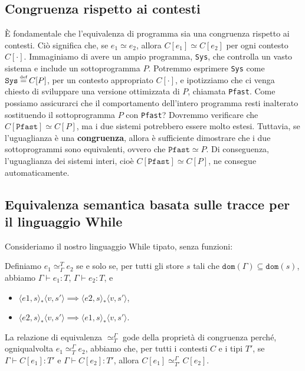 \subsection{Congruenza rispetto ai contesti}
È fondamentale che l'equivalenza di programma sia una congruenza rispetto ai
contesti. Ciò significa che, se \( e_1 \simeq e_2 \), allora \( C[e_1] \simeq
C[e_2] \) per ogni contesto \( C[\cdot] \). Immaginiamo di avere un ampio programma,
\texttt{Sys}, che controlla un vasto sistema e include un sottoprogramma \( P \).
Potremmo esprimere \texttt{Sys} come \( \texttt{Sys} \defeq C[P] \), per un contesto
appropriato \( C[\cdot] \), e ipotizziamo che ci venga chiesto di sviluppare una
versione ottimizzata di \( P \), chiamata \texttt{Pfast}. Come possiamo assicurarci
che il comportamento dell'intero programma resti inalterato sostituendo il
sottoprogramma \( P \) con \texttt{Pfast}? Dovremmo verificare che \(
C[\texttt{Pfast}] \simeq C[P] \), ma i due sistemi potrebbero essere molto
estesi. Tuttavia, se l'uguaglianza è una \textbf{congruenza}, allora è
sufficiente dimostrare che i due sottoprogrammi sono equivalenti, ovvero che
\( \texttt{Pfast} \simeq P \). Di conseguenza, l'uguaglianza dei sistemi
interi, cioè \( C[\texttt{Pfast}] \simeq C[P] \), ne consegue automaticamente.
\subsection{Equivalenza semantica basata sulle tracce per il linguaggio While}
Consideriamo il nostro linguaggio While tipato, senza funzioni:
\begin{tcolorbox}[title = Equivalenza delle tracce $\simeq_\Gamma^T$]
    Definiamo \( e_1 \simeq^T_\Gamma e_2 \) se e solo se, per tutti gli store \( s \)
    tali che \( \texttt{dom}(\Gamma) \subseteq \texttt{dom}(s) \), abbiamo
    \( \Gamma \vdash e_1 : T \), \( \Gamma \vdash e_2 : T \), e
    \begin{itemize}
        \item $\langle e1, s \rangle_* \langle v, s' \rangle \implies \langle e2, s \rangle_* \langle v, s' \rangle$,
        \item $\langle e2, s \rangle_* \langle v, s' \rangle \implies \langle e1, s \rangle_* \langle v, s' \rangle$.
    \end{itemize}
\end{tcolorbox}
\begin{tcolorbox}[title = Proprietà di congruenza]
    La relazione di equivalenza \( \simeq_T^\Gamma \) gode della proprietà di
    congruenza perché, ogniqualvolta \( e_1 \simeq_T^\Gamma e_2 \), abbiamo che,
    per tutti i contesti \( C \) e i tipi \( T' \), se \( \Gamma \vdash C[e_1] :
    T' \) e \( \Gamma \vdash C[e_2] : T' \), allora \( C[e_1] \simeq_{T'}^\Gamma
    C[e_2] \).
\end{tcolorbox}
